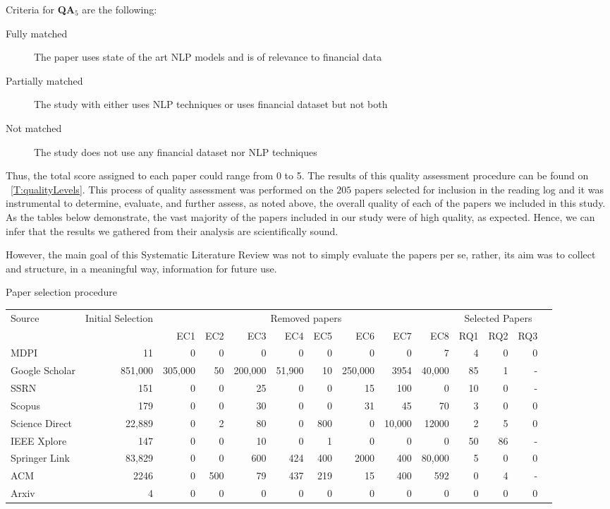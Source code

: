 \documentclass[11pt]{article}
\begin{document}
Criteria for \textbf{QA$_5$} are the following:
\begin{description}
    \item[Fully matched] The paper uses state of the art NLP models and is of relevance to financial data
    \item[Partially matched] The study with either uses NLP techniques or uses financial dataset but not both
    \item[Not matched] The study does not use any financial dataset nor NLP techniques
\end{description}

Thus, the total score assigned to each paper could range from 0 to 5. The results of this quality assessment procedure can be found on ~\ref{T:qualityLevels}. This process of quality assessment was performed on the $205$ papers selected for inclusion in the reading log and it was instrumental to determine, evaluate, and further assess, as noted above, the overall quality of each of the papers we included in this study. As the tables below demonstrate, the vast majority of the papers included in our study were of high quality, as expected. Hence, we can infer that the results we gathered from their analysis are scientifically sound.

However, the main goal of this Systematic Literature Review was not to simply evaluate the papers per se, rather, its aim was to collect and structure, in a meaningful way, information for future use.

\begin{adjustwidth}{-2.5 cm}{-2.5 cm}\centering\begin{threeparttable}[!htb]

\caption{Paper selection procedure}\label{tab:paperselection}
\scriptsize
\begin{tabular}{lrrrrrrrrrrrrr}\toprule
Source &Initial Selection &\multicolumn{8}{c}{Removed papers} &\multicolumn{3}{c}{Selected Papers} \\\cmidrule{1-13}
& &EC1 &EC2 &EC3 &EC4 &EC5 &EC6 &EC7 &EC8 &RQ1 &RQ2 &RQ3 \\\midrule
MDPI &11 &0 &0 &0 &0 &0 &0 &0 &7 &4 &0 &0 \\
Google Scholar &851,000 &305,000 &50 &200,000 &51,900 &10 &250,000 &3954 &40,000 &85 &1 &- \\
SSRN &151 &0 &0 &25 &0 &0 &15 &100 &0 &10 &0 &- \\
Scopus &179 &0 &0 &30 &0 &0 &31 &45 &70 &3 &0 &0 \\
Science Direct &22,889 &0 &2 &80 &0 &800 &0 &10,000 &12000 &2 &5 &0 \\
IEEE Xplore &147 &0 &0 &10 &0 &1 &0 &0 &0 &50 &86 &- \\
Springer Link &83,829 &0 &0 &600 &424 &400 &2000 &400 &80,000 &5 &0 &0 \\
ACM &2246 &0 &500 &79 &437 &219 &15 &400 &592 &0 &4 &- \\
Arxiv &4 &0 &0 &0 &0 &0 &0 &0 &0 &0 &0 &0 \\
\bottomrule
\end{tabular}
\end{threeparttable}\end{adjustwidth}
\end{document}
